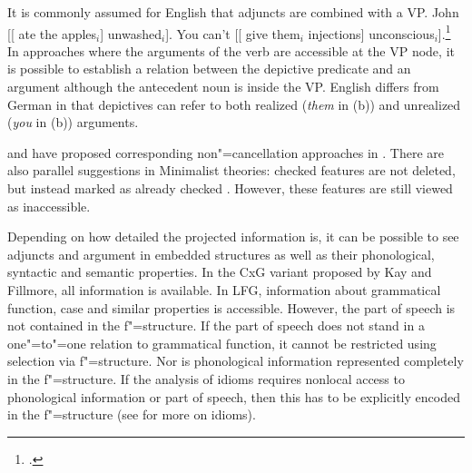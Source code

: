 It is commonly assumed for English that adjuncts are combined with a VP.
\eal
\ex John [[ ate the apples$_i$] unwashed$_i$].
\ex You can't [[ give them$_i$ injections] unconscious$_i$].\footnote{%
.
}
\zl
In approaches where the arguments of the verb are accessible at the VP node, it is possible to establish a relation between
the depictive predicate and an argument although the antecedent noun is inside the VP.
English differs from German in that depictives can refer to both realized (\emph{them} in (b))
and unrealized (\emph{you} in (b)) arguments.

\citet[]{Higginbotham85a} and \citet{Winkler97a} have proposed corresponding non"=cancellation approaches in \gbt.
There are also parallel suggestions in Minimalist theories: checked features are not deleted, but instead marked as already
checked \citep[]{Stabler2010b}. However, these features are still viewed as inaccessible.\label{page-non-cancellation-end}

Depending on how detailed the projected information is, it can be possible to see adjuncts and argument in embedded structures as well as their
phonological, syntactic and semantic properties. In the CxG variant proposed by Kay and Fillmore, all information is available. In LFG,
information about grammatical function, case and similar properties is accessible. However, the part of speech is not contained in the f"=structure.
If the part of speech does not stand in a one"=to"=one relation to grammatical function, it cannot be restricted using selection via f"=structure.
Nor is phonological information represented completely in the f"=structure. If the analysis of idioms requires nonlocal access to phonological
information or part of speech, then this has to be explicitly encoded in the f"=structure (see  for more on idioms). 

